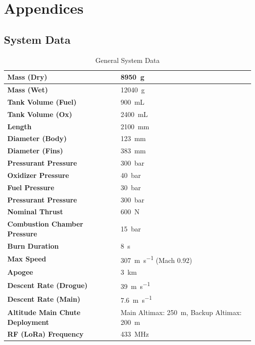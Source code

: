 \chapter{Appendices}
\label{sec:appendices}

\section{System Data}

\begin{table}[h]
\centering
\begin{tabular}{|l|l|}
\hline
\textbf{Mass (Dry)}                     & \SI{8950}{\gram} \\ \hline
\textbf{Mass (Wet)}                     & \SI{12040}{\gram} \\ \hline
\textbf{Tank Volume (Fuel)}             & \SI{900}{\milli\liter} \\ \hline
\textbf{Tank Volume (Ox)}               & \SI{2400}{\milli\liter} \\ \hline
\textbf{Length}                         & \SI{2100}{\milli\meter} \\ \hline
\textbf{Diameter (Body)}                & \SI{123}{\milli\meter} \\ \hline
\textbf{Diameter (Fins)}                & \SI{383}{\milli\meter} \\ \hline
\textbf{Pressurant Pressure}            & \SI{300}{\bar} \\ \hline
\textbf{Oxidizer Pressure}              & \SI{40}{\bar} \\ \hline
\textbf{Fuel Pressure}                  & \SI{30}{\bar} \\ \hline
\textbf{Pressurant Pressure}            & \SI{300}{\bar} \\ \hline
\textbf{Nominal Thrust}                 & \SI{600}{\newton} \\ \hline
\textbf{Combustion Chamber Pressure}    & \SI{15}{\bar} \\ \hline
\textbf{Burn Duration}                  & \SI{8}{\second} \\ \hline
\textbf{Max Speed}                      & \SI{307}{\meter\per\second} (Mach 0.92) \\ \hline
\textbf{Apogee}                         & \SI{3}{\kilo\meter} \\ \hline
\textbf{Descent Rate (Drogue)}          & \SI{39}{\meter\per\second} \\ \hline
\textbf{Descent Rate (Main)}            & \SI{7.6}{\meter\per\second} \\ \hline
\textbf{Altitude Main Chute Deployment} & Main Altimax: \SI{250}{\meter}, Backup Altimax: \SI{200}{\meter} \\ \hline
\textbf{RF (LoRa) Frequency}            & \SI{433}{\mega\hertz} \\ \hline
\end{tabular}
\caption{General System Data}
\label{tab:system_data}
\end{table}

